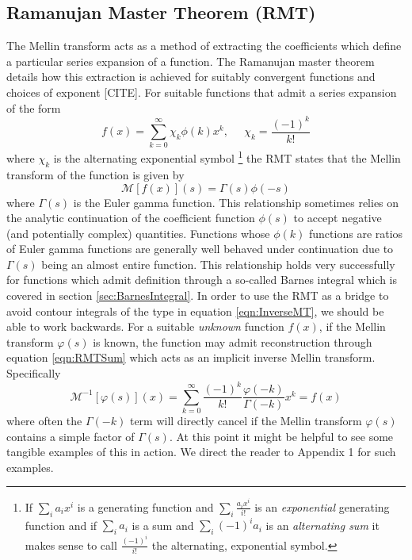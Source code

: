\documentclass[journal=jcisd8,manuscript=article,layout=onecolumn,pdftex,floatfix,amsmath,amssymb,10pt]{achemso}
\begin{document}
\subsection{Ramanujan Master Theorem (RMT)}
The Mellin transform acts as a method of extracting the coefficients which define a particular series expansion of a function. The Ramanujan master theorem details how this extraction is achieved for suitably convergent functions and choices of exponent [CITE]. For suitable functions that admit a series expansion of the form
\begin{equation}
f(x) = \sum_{k=0}^\infty \chi_k \phi(k)x^k, \;\;\;\;\; \chi_k = \frac{(-1)^k}{k!}
\label{eqn:RMTSum}
\end{equation}
where $\chi_k$ is the alternating exponential symbol \footnote{If $\sum_i a_ix^i$ is a generating function and $\sum_i \frac{a_ix^i}{i!}$ is an \emph{exponential} generating function and if $\sum_{i} a_i$ is a sum and $\sum_i (-1)^i a_i$ is an \emph{alternating sum} it makes sense to call $\frac{(-1)^i}{i!}$ the alternating, exponential symbol.} the RMT states that the Mellin transform of the function is given by
\begin{equation}
\mathcal{M}[f(x)](s) = \Gamma(s)\phi(-s)
\end{equation}
where $\Gamma(s)$ is the Euler gamma function. This relationship sometimes relies on the analytic continuation of the coefficient function $\phi(s)$ to accept negative (and potentially complex) quantities. Functions whose $\phi(k)$ functions are ratios of Euler gamma functions are generally well behaved under continuation due to $\Gamma(s)$ being an almost entire function. This relationship holds very successfully for functions which admit definition through a so-called Barnes integral which is covered in section \ref{sec:BarnesIntegral}. In order to use the RMT as a bridge to avoid contour integrals of the type in equation \ref{eqn:InverseMT}, we should be able to work backwards. For a suitable \emph{unknown} function $f(x)$, if the Mellin transform $\varphi(s)$ is known, the function may admit reconstruction through equation \ref{eqn:RMTSum} which acts as an implicit inverse Mellin transform. Specifically
\begin{equation}
\mathcal{M}^{-1}[\varphi(s)](x) = \sum_{k=0}^\infty \frac{(-1)^k}{k!}\frac{\varphi(-k)}{\Gamma(-k)}x^k = f(x)
\label{eqn:ImplicitInverseMellin}
\end{equation}
where often the $\Gamma(-k)$ term will directly cancel if the Mellin transform $\varphi(s)$ contains a simple factor of $\Gamma(s)$. At this point it might be helpful to see some tangible examples of this in action. We direct the reader to {\color{red} Appendix 1} for such examples.
\end{document}
